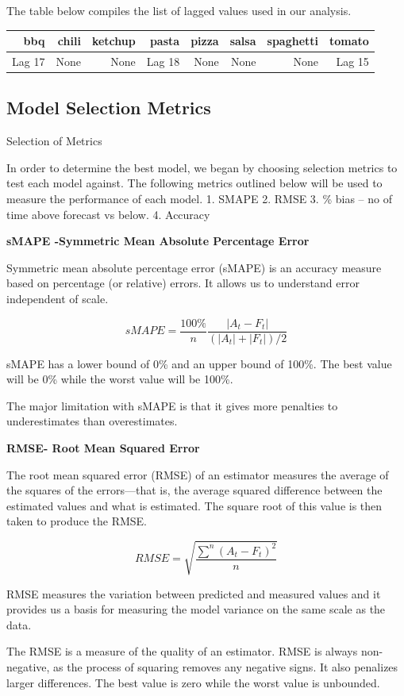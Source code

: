 \documentclass[12pt,oneside]{chicagocapstone}
\begin{document}
The table below compiles the list of lagged values used in our analysis.
\begin{longtable}[]{@{}rrrrrrrr@{}}
\toprule
bbq & chili & ketchup & pasta & pizza & salsa & spaghetti &
tomato\tabularnewline
\midrule
\endhead
Lag 17 & None & None & Lag 18 & None & None & None & Lag
15\tabularnewline
\bottomrule
\end{longtable}
\subsection*{Model Selection Metrics}\label{model-selection-metrics}

Selection of Metrics

In order to determine the best model, we began by choosing selection
metrics to test each model against. The following metrics outlined below
will be used to measure the performance of each model. 1. SMAPE 2. RMSE
3. \% bias -- no of time above forecast vs below. 4. Accuracy

\textbf{sMAPE -Symmetric Mean Absolute Percentage Error}

Symmetric mean absolute percentage error (sMAPE) is an accuracy measure
based on percentage (or relative) errors. It allows us to understand
error independent of scale.

\[sMAPE=\frac{100\%}{n}\frac{|A_t-F_t|}{(|A_t|+|F_t|)/2}\]

sMAPE has a lower bound of 0\% and an upper bound of 100\%. The best
value will be 0\% while the worst value will be 100\%.

The major limitation with sMAPE is that it gives more penalties to
underestimates than overestimates.

\textbf{RMSE- Root Mean Squared Error}

The root mean squared error (RMSE) of an estimator measures the average
of the squares of the errors---that is, the average squared difference
between the estimated values and what is estimated. The square root of
this value is then taken to produce the RMSE.

\[RMSE = \sqrt{\frac{\sum^n(A_t-F_t)^2}{n}}\]

RMSE measures the variation between predicted and measured values and it
provides us a basis for measuring the model variance on the same scale
as the data.

The RMSE is a measure of the quality of an estimator. RMSE is always
non-negative, as the process of squaring removes any negative signs. It
also penalizes larger differences. The best value is zero while the
worst value is unbounded.
\end{document}
